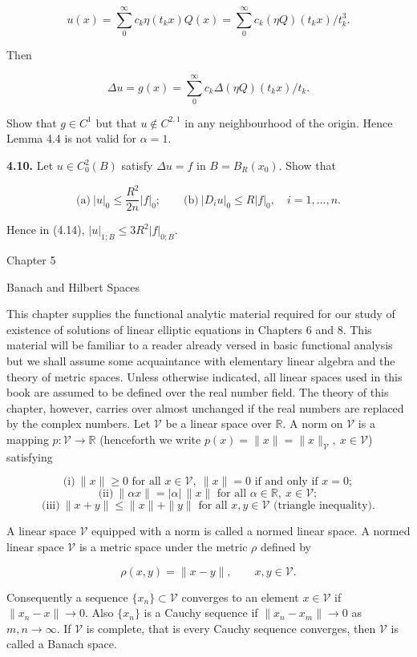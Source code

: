 \[
u(x)=\sum_{0}^{\infty} c_k\eta(t_k x)Q(x)=\sum_{0}^{\infty} c_k(\eta Q)(t_kx)/t_k^3.
\]

Then

\[
\Delta u=g(x)=\sum_{0}^{\infty} c_k \Delta(\eta Q)(t_k x)/t_k.
\]

Show that $g\in C^1$ but that $u\notin C^{2,1}$ in any neighbourhood of the origin. Hence Lemma 4.4 is not valid for $\alpha=1$.

\medskip

\noindent\textbf{4.10.} Let $u\in C_0^2(B)$ satisfy $\Delta u=f$ in $B=B_R(x_0)$. Show that

\[
\text{(a)}\ |u|_0\le \frac{R^2}{2n}|f|_0;\qquad
\text{(b)}\ |D_i u|_0\le R|f|_0,\quad i=1,\ldots,n.
\]

Hence in (4.14), $|u|_{1;B}\le 3R^2|f|_{0;B}$.



Chapter 5

Banach and Hilbert Spaces

This chapter supplies the functional analytic material required for our study of
existence of solutions of linear elliptic equations in Chapters 6 and 8. This material
will be familiar to a reader already versed in basic functional analysis but we shall
assume some acquaintance with elementary linear algebra and the theory of metric
spaces. Unless otherwise indicated, all linear spaces used in this book are assumed
to be defined over the real number field. The theory of this chapter, however, carries
over almost unchanged if the real numbers are replaced by the complex numbers.
Let $\mathcal V$ be a linear space over $\mathbb R$. A norm on $\mathcal V$ is a mapping $p: \mathcal V \to \mathbb R$ (henceforth
we write $p(x)=\|x\|=\|x\|_{\mathcal V},\ x\in \mathcal V$) satisfying

\[
\text{(i)}\ \|x\|\ge 0\text{ for all }x\in \mathcal V,\ \|x\|=0\text{ if and only if }x=0;
\]
\[
\text{(ii)}\ \|\alpha x\|=|\alpha|\,\|x\|\text{ for all }\alpha\in \mathbb R,\ x\in \mathcal V;
\]
\[
\text{(iii)}\ \|x+y\|\le \|x\|+\|y\|\text{ for all }x,y\in \mathcal V\text{ (triangle inequality).}
\]

A linear space $\mathcal V$ equipped with a norm is called a normed linear space. A normed
linear space $\mathcal V$ is a metric space under the metric $\rho$ defined by

\[
\rho(x,y)=\|x-y\|,\qquad x,y\in \mathcal V.
\]

Consequently a sequence $\{x_n\}\subset \mathcal V$ converges to an element $x\in \mathcal V$ if $\|x_n-x\|\to 0$.
Also $\{x_n\}$ is a Cauchy sequence if $\|x_n-x_m\|\to 0$ as $m,n\to \infty$. If $\mathcal V$ is complete,
that is every Cauchy sequence converges, then $\mathcal V$ is called a Banach space.

